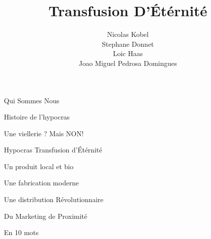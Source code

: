 \documentclass[11pt]{beamer}
\author{Nicolas Kobel\\Stephane Donnet\\Loic Haas\\Joao Miguel Pedrosa Domingues}
\title{Transfusion D'Étérnité}
\begin{document}
\begin{frame}
\titlepage
\end{frame}


\begin{frame}{Qui Sommes Nous}
\end{frame}
\begin{frame}{Histoire de l'hypocras}

\end{frame}

\begin{frame}{Une viellerie ? Mais NON!}
\end{frame}
\begin{frame}{Hypocras Transfusion d'Étérnité}
\end{frame}
\begin{frame}{Un produit local et bio}
\end{frame}
\begin{frame}{Une fabrication moderne}
\end{frame}
\begin{frame}{Une distribution Révolutionnaire}
\end{frame}
\begin{frame}{Du Marketing de Proximité}
\end{frame}
\begin{frame}{En 10 mots}
\end{frame}
\end{document}
